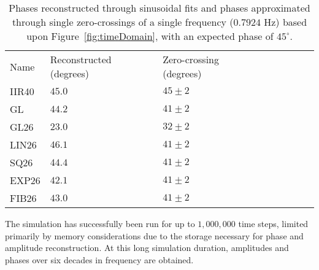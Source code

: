 \begin{table}
\begin{tabular}{llllllll}
\hline
Name &Reconstructed (degrees) &Zero-crossing (degrees)\\ IIR40 &$45.0$
&$45\pm 2$\\ GL &$44.2$ &$41\pm 2$\\ GL26 &$23.0$ &$32\pm 2$\\ LIN26
&$46.1$ &$41\pm 2$\\ SQ26 &$44.4$ &$41\pm 2$\\ EXP26 &$42.1$ &$41\pm
2$\\ FIB26 &$43.0$ &$41\pm 2$\\
\hline
\end{tabular}
\label{tab:phaseRecon}
\caption{Phases reconstructed through sinusoidal fits and phases approximated through single zero-crossings of a single frequency ($0.7924$ Hz) based upon Figure~\ref{fig:timeDomain}, with an expected phase of $45^\circ$.}
\end{table}

The simulation has successfully been run for up to $1,000,000$ time
steps, limited primarily by memory considerations due to the storage
necessary for phase and amplitude reconstruction. At this long
simulation duration, amplitudes and phases over six decades in
frequency are obtained.
